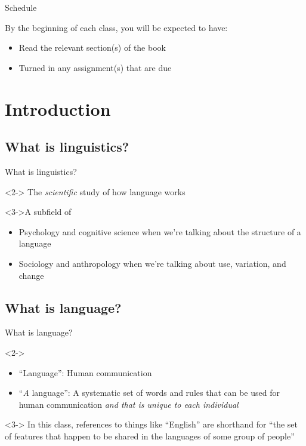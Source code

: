 \documentclass{beamer}
\newcommand{\subtwoone}{What is linguistics?}
\newcommand{\subtwotwo}{What is language?}
\begin{document}
    \begin{frame}{Schedule}
      \begin{block}{}
        By the beginning of each class, you will be expected to have:
        \begin{itemize}
          \item Read the relevant section(s) of the book
          \item Turned in any assignment(s) that are due
        \end{itemize}
      \end{block}
    \end{frame}

  \section{Introduction}
    \subsection{\subtwoone}
      \begin{frame}{\subtwoone}
        \begin{definition}<2->
          The \emph{scientific} study of how language works
        \end{definition}
        \begin{block}<3->{A subfield of}
          \begin{itemize}
            \item Psychology and cognitive science when we're talking about the structure of a language
            \item Sociology and anthropology when we're talking about use, variation, and change
          \end{itemize}
        \end{block}
      \end{frame}

    \subsection{\subtwotwo}
      \begin{frame}{\subtwotwo}
        \begin{definition}<2->{}
          \begin{itemize}
            \item ``Language'': Human communication
            \item ``\emph{A} language'': A systematic set of words and rules that can be used for human communication \emph{and that is unique to each individual}
          \end{itemize}
        \end{definition}
        \begin{alertblock}<3->{}
          In this class, references to things like ``English'' are shorthand for ``the set of features that happen to be shared in the languages of some group of people''
        \end{alertblock}
      \end{frame}
\end{document}
